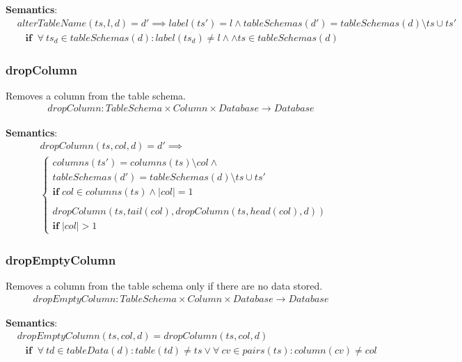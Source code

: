 \documentclass[10pt]{article}
\begin{document}
\noindent \textbf{Semantics}:
\begin{align}
& alterTableName(ts, l, d) = d' \implies label(ts') = l \land tableSchemas(d') = tableSchemas(d) \setminus ts \cup ts'  \nonumber \\
& \;\;\; \mathbf{if}  \;\;  \forall \: ts_d \in tableSchemas(d) : label(ts_d) \neq l \land \land ts \in tableSchemas(d) 
\end{align}

\subsubsection{dropColumn}
Removes a column from the table schema.
\begin{align}
dropColumn: TableSchema \times Column \times Database \rightarrow Database
\end{align}

\noindent \textbf{Semantics}:
\begin{align}
& dropColumn(ts, col, d) = d' \implies \\
& \begin{cases}
 columns(ts') = columns(ts) \setminus col \land \nonumber \\
     tableSchemas(d') = tableSchemas(d) \setminus ts \cup ts'  \nonumber \\
 \mathbf{if}  \; col \in columns(ts) \land |col| = 1
 \\\\
 dropColumn(ts, tail(col), dropColumn(ts, head(col), d)) \\
 \mathbf{if} \; |col| > 1
 \end{cases}
\end{align}

\subsubsection{dropEmptyColumn}
Removes a column from the table schema only if there are no data stored.
\begin{align}
dropEmptyColumn: TableSchema \times Column \times Database \rightarrow Database
\end{align}

\noindent \textbf{Semantics}:
\begin{align}
& dropEmptyColumn(ts, col, d) = dropColumn(ts, col, d)  \nonumber \\
& \;\;\; \mathbf{if}  \;\; \forall \: td \in tableData(d) : table(td) \neq ts \lor \forall \: cv \in pairs(ts) : column(cv) \neq col
\end{align}
\end{document}
